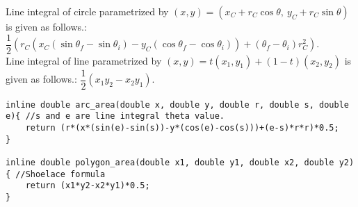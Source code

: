 \documentclass[landscape, 8pt, a4paper, oneside,  twocolumn]{extarticle}
\begin{document}
Line integral of circle parametrized by $(x, y) = (x_C + r_C \cos \theta, \ y_C + r_C \sin \theta)$ is given as follows.:  $\dfrac{1}{2}( r_C (x_C (\sin \theta_f - \sin \theta_i) - y_C (\cos \theta_f - \cos \theta_i) ) + (\theta_f - \theta_i) r_C ^ 2)$. \\

Line integral of line parametrized by $(x, y) = t(x_1, y_1) + (1-t)(x_2, y_2)$ is given as follows.: $\dfrac{1}{2} (x_1 y_2 - x_2 y_1)$.

\begin{verbatim}
inline double arc_area(double x, double y, double r, double s, double e){ //s and e are line integral theta value.
	return (r*(x*(sin(e)-sin(s))-y*(cos(e)-cos(s)))+(e-s)*r*r)*0.5;
}

inline double polygon_area(double x1, double y1, double x2, double y2){ //Shoelace formula 
	return (x1*y2-x2*y1)*0.5;
}
\end{verbatim}
\end{document}
